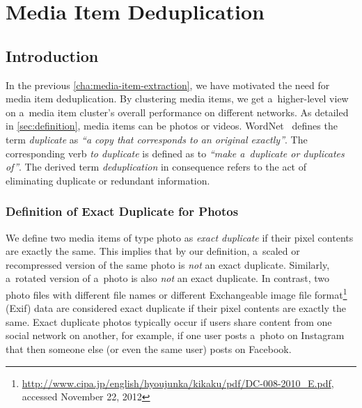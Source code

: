 \chapter{Media Item Deduplication}
\label{cha:media-item-deduplication}

\ifpdf
    \graphicspath{{6_media_item_deduplication/figures/PNG/}{6_media_item_deduplication/figures/PDF/}{6_media_item_deduplication/figures/}}
\else
    \graphicspath{{6_media_item_deduplication/figures/EPS/}{6_media_item_deduplication/figures/}}
\fi

\section{Introduction}

In the previous \autoref{cha:media-item-extraction},
we have motivated the need for media item deduplication.
By clustering media items, we get a~higher-level view on
a~media item cluster's overall performance on different networks.
As detailed in \autoref{sec:definition}, media items can be
photos or videos.
WordNet~\cite{fellbaum1998wordnet,miller1995wordnet} defines
the term \emph{duplicate} as
\textit{``a copy that corresponds to an original exactly''}.
The corresponding verb \emph{to duplicate} is defined as to
\textit{``make a~duplicate or duplicates of''}.
The derived term \emph{deduplication} in consequence refers to
the act of eliminating duplicate or redundant information.

\subsection{Definition of Exact Duplicate for Photos}

We define two media items of type photo as \emph{exact duplicate}
if their pixel contents are exactly the same.
This implies that by our definition, a~scaled or recompressed version
of the same photo is \emph{not} an exact duplicate. 
Similarly, a~rotated version of a~photo is also \emph{not}
an exact duplicate. 
In contrast, two photo files with different file names
or different Exchangeable image file
format\footnote{\url{http://www.cipa.jp/english/hyoujunka/kikaku/pdf/DC-008-2010_E.pdf},
accessed November 22, 2012}
(Exif) data are considered exact duplicate
if their pixel contents are exactly the same.
Exact duplicate photos typically occur if users share content 
from one social network on another, for example,
if one user posts a~photo on Instagram that then someone else
(or even the same user) posts on Facebook.

